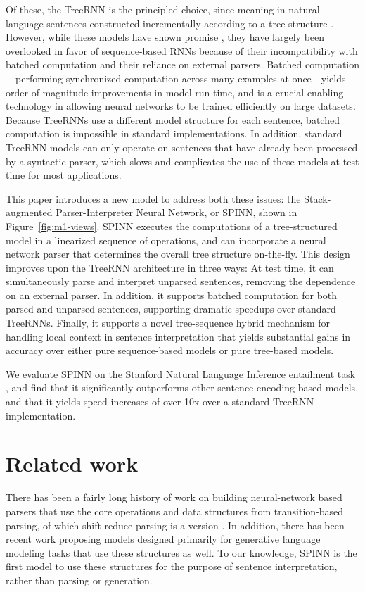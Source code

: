 \documentclass[11pt]{article}
\begin{document}
Of these, the TreeRNN is the principled choice, since meaning in natural language sentences constructed incrementally according to a tree structure \citep{Partee84,Janssen97}. However, while these models have shown promise \citep{tai2015improved,li2015tree,bowman2015trees}, they have largely been overlooked in favor of sequence-based RNNs because of their incompatibility with batched computation and their reliance on external parsers.  Batched computation---performing synchronized computation across many examples at once---yields order-of-magnitude improvements in model run time, and is a crucial enabling technology in allowing neural networks to be trained efficiently on large datasets. Because TreeRNNs use a different model structure for each sentence, batched computation is impossible in standard implementations. In addition, standard TreeRNN models can only operate on sentences that have already been processed by a syntactic parser, which slows and complicates the use of these models at test time for most applications.

This paper introduces a new model to address both these issues: the Stack-augmented Parser-Interpreter Neural Network, or SPINN, shown in Figure~\ref{fig:m1-views}. SPINN executes the computations of a tree-structured model in a linearized sequence of operations, and can incorporate a neural network parser that determines the overall tree structure on-the-fly. This design improves upon the TreeRNN architecture in three ways: At test time, it can simultaneously parse and interpret unparsed sentences, removing the dependence on an external parser. In addition, it supports batched computation for both parsed and unparsed sentences, supporting dramatic speedups over standard TreeRNNs. Finally, it supports a novel tree-sequence hybrid mechanism for handling local context in sentence interpretation that yields substantial gains in accuracy over either pure sequence-based models or pure tree-based models.

We evaluate SPINN on the Stanford Natural Language Inference entailment task \citep[SNLI,][]{snli:emnlp2015}, and find that it significantly outperforms other sentence encoding-based models, and that it yields speed increases of over 10x over a standard TreeRNN implementation.

\section{Related work}

There has been a fairly long history of work on building neural-network based parsers that use the core operations and data structures from transition-based parsing, of which shift-reduce parsing is a version \citep{henderson2004discriminative,emami2005neural,titov2010latent,chen2014,buys2generative,dyer-EtAl:2015:ACL-IJCNLP,kiperwasser2016easy}. In addition, there has been recent work \citep{zhang2016top,dyer2016rnn} proposing models designed primarily for generative language modeling tasks that use these structures as well. To our knowledge, SPINN is the first model to use these structures for the purpose of sentence interpretation, rather than parsing or generation.
\end{document}
